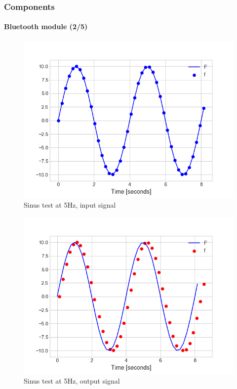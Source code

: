 \documentclass[10pt]{beamer}
\begin{document}

\begin{frame}
\frametitle{Components}
\framesubtitle{Bluetooth module (2/5)}
\begin{multicols}{2}
\begin{figure}
\centering
\includegraphics[scale=0.4]{figures/sending-5hz.png}
\caption{Sinus test at 5Hz, input signal}
\label{fig:sinus-i-5}
\end{figure}
\columnbreak
\begin{figure}
\centering
\includegraphics[scale=0.4]{figures/reception-5hz.png}
\caption{Sinus test at 5Hz, output signal}
\label{fig:sinus-o-5}
\end{figure}
\end{multicols}
\end{frame}
\end{document}
